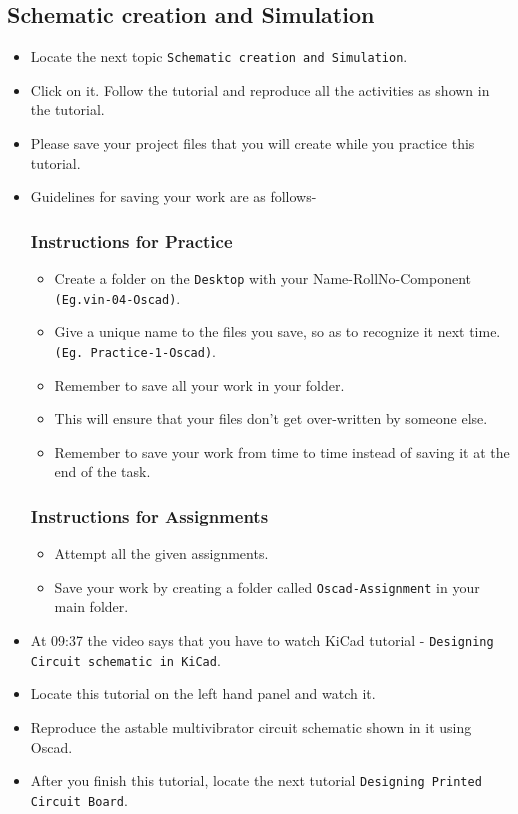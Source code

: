 \subsection{Schematic creation and Simulation }
\begin{itemize}
\item Locate the next topic {\tt Schematic creation and Simulation}.
\item Click on it. Follow the tutorial and reproduce all the activities as shown in the tutorial.
\item Please save your project files that you will create while you practice this tutorial.
\item Guidelines for saving your work are as follows-
  
  \subsubsection{Instructions for Practice}
  \begin{itemize}
  \item Create a folder on the {\tt Desktop} with your Name-RollNo-Component {\tt (Eg.vin-04-Oscad)}.
  \item Give a unique name to the files you save, so as to recognize it next time. 
  {\tt (Eg. Practice-1-Oscad)}.
  \item Remember to save all your work in your folder.  
  \item This will ensure that your files don't get over-written by someone else.
  \item Remember to save your work from time to time instead of saving it at the end of the task.
  \end{itemize}
  \subsubsection{Instructions for Assignments}
  \begin{itemize}
  \item Attempt all the given assignments.
  \item Save your work by creating a folder called {\tt Oscad-Assignment} in your main folder.
  \end{itemize}
  
\item At 09:37 the video says that you have to watch KiCad tutorial - {\tt Designing Circuit schematic in KiCad}.
\item Locate this tutorial on the left hand panel and watch it.
\item Reproduce the astable multivibrator circuit schematic shown in it using Oscad.
 \item After you finish this tutorial, locate the next tutorial {\tt Designing Printed Circuit Board}.
\end{itemize}


